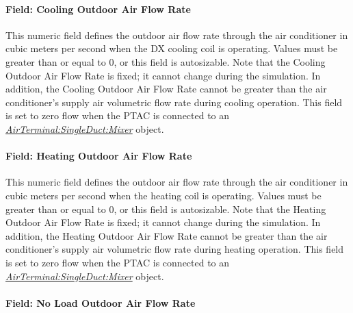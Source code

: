 \paragraph{Field: Cooling Outdoor Air Flow Rate}\label{field-cooling-outdoor-air-flow-rate-001}

This numeric field defines the outdoor air flow rate through the air conditioner in cubic meters per second when the DX cooling coil is operating. Values must be greater than or equal to 0, or this field is autosizable. Note that the Cooling Outdoor Air Flow Rate is fixed; it cannot change during the simulation. In addition, the Cooling Outdoor Air Flow Rate cannot be greater than the air conditioner's supply air volumetric flow rate during cooling operation. This field is set to zero flow when the PTAC is connected to an \textit{\hyperref[airterminalsingleductmixer]{AirTerminal:SingleDuct:Mixer}} object.

\paragraph{Field: Heating Outdoor Air Flow Rate}\label{field-heating-outdoor-air-flow-rate-001}

This numeric field defines the outdoor air flow rate through the air conditioner in cubic meters per second when the heating coil is operating. Values must be greater than or equal to 0, or this field is autosizable. Note that the Heating Outdoor Air Flow Rate is fixed; it cannot change during the simulation. In addition, the Heating Outdoor Air Flow Rate cannot be greater than the air conditioner's supply air volumetric flow rate during heating operation. This field is set to zero flow when the PTAC is connected to an \textit{\hyperref[airterminalsingleductmixer]{AirTerminal:SingleDuct:Mixer}} object.

\paragraph{Field: No Load Outdoor Air Flow Rate}\label{field-no-load-outdoor-air-flow-rate-000}

